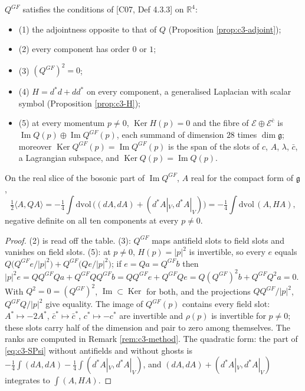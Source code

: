 \begin{theorem}
\label{prop:c3-axioms}
$Q^{GF}$ satisfies the conditions of [C07, Def 4.3.3] on $\mathbb R^4$:
\begin{itemize}
\item (1) the adjointness opposite to that of $Q$ (Proposition \ref{prop:c3-adjoint});
\item (2) every component has order $0$ or $1$;
\item (3) $(Q^{GF})^2=0$;
\item (4) $H=d^*d+dd^*$ on every component, a generalised Laplacian with scalar symbol (Proposition \ref{prop:c3-H});
\item (5) at every momentum $p\neq0$, $\operatorname{Ker}H(p)=0$ and the fibre of $\mathscr E\oplus\mathscr E^{\bar c}$ is $\operatorname{Im}Q(p)\oplus\operatorname{Im}Q^{GF}(p)$, each summand of dimension $28$ times $\dim\mathfrak g$; moreover $\operatorname{Ker}Q^{GF}(p)=\operatorname{Im}Q^{GF}(p)$ is the span of the slots of $c$, $A$, $\lambda$, $\bar c$, a Lagrangian subspace, and $\operatorname{Ker}Q(p)=\operatorname{Im}Q(p)$.
\end{itemize}
On the real slice of the bosonic part of $\operatorname{Im}Q^{GF}$, $A$ real for the compact form of $\mathfrak g$,
\[
\tfrac12\langle A,QA\rangle=-\tfrac14\int\mathrm{dvol}\,\big((dA,dA)+(d^*A|_V,d^*A|_V)\big)=-\tfrac14\int\mathrm{dvol}\,(A,HA),
\]
negative definite on all ten components at every $p\neq0$.
\end{theorem}

\begin{proof}
(2) is read off the table. (3): $Q^{GF}$ maps antifield slots to field slots and vanishes on field slots. (5): at $p\neq0$, $H(p)=|p|^2$ is invertible, so every $e$ equals $Q\big(Q^{GF}e/|p|^2\big)+Q^{GF}\big(Qe/|p|^2\big)$; if $e=Qa=Q^{GF}b$ then $|p|^2e=QQ^{GF}Qa+Q^{GF}QQ^{GF}b=QQ^{GF}e+Q^{GF}Qe=Q(Q^{GF})^2b+Q^{GF}Q^2a=0$. With $Q^2=0=(Q^{GF})^2$, $\operatorname{Im}\subset\operatorname{Ker}$ for both, and the projections $QQ^{GF}/|p|^2$, $Q^{GF}Q/|p|^2$ give equality. The image of $Q^{GF}(p)$ contains every field slot: $A^*\mapsto-2A^*$, $\bar c^*\mapsto\bar c^*$, $c^*\mapsto-c^*$ are invertible and $\rho(p)$ is invertible for $p\neq0$; these slots carry half of the dimension and pair to zero among themselves. The ranks are computed in Remark \ref{rem:c3-method}. The quadratic form: the part of \eqref{eq:c3-SPsi} without antifields and without ghosts is $-\tfrac14\int(dA,dA)-\tfrac14\int(d^*A|_V,d^*A|_V)$, and $(dA,dA)+(d^*A|_V,d^*A|_V)$ integrates to $\int(A,HA)$.
\end{proof}

